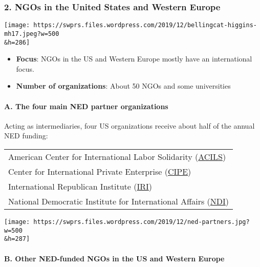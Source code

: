 \hypertarget{2-ngos-in-the-united-states-and-western-europe}{%
\subsubsection{2. NGOs in the United States and Western
Europe}\label{2-ngos-in-the-united-states-and-western-europe}}

\texttt{[image: https://swprs.files.wordpress.com/2019/12/bellingcat-higgins-mh17.jpeg?w=500\\\&h=286]}

\begin{itemize}
\tightlist
\item
  \textbf{Focus}: NGOs in the US and Western Europe mostly have an
  international focus.
\item
  \textbf{Number of organizations}: About 50 NGOs and some universities
\end{itemize}

\hypertarget{a-the-four-main-ned-partner-organizations}{%
\paragraph{A. The four main NED partner
organizations}\label{a-the-four-main-ned-partner-organizations}}

Acting as intermediaries, four US organizations receive about half of
the annual NED funding:

\begin{longtable}[]{@{}l@{}}
\toprule
\endhead
American Center for International Labor Solidarity
(\href{https://en.wikipedia.org/wiki/Solidarity_Center}{ACILS})\tabularnewline
Center for International Private Enterprise
(\href{https://www.cipe.org}{CIPE})\tabularnewline
International Republican Institute
(\href{https://en.wikipedia.org/wiki/International_Republican_Institute}{IRI})\tabularnewline
National Democratic Institute for International Affairs
(\href{https://en.wikipedia.org/wiki/National_Democratic_Institute}{NDI})\tabularnewline
\bottomrule
\end{longtable}

\texttt{[image: https://swprs.files.wordpress.com/2019/12/ned-partners.jpg?w=500\\\&h=287]}

\hypertarget{b-other-ned-funded-ngos-in-the-us-and-western-europe}{%
\paragraph{B. Other NED-funded NGOs in the US and Western
Europe}\label{b-other-ned-funded-ngos-in-the-us-and-western-europe}}


